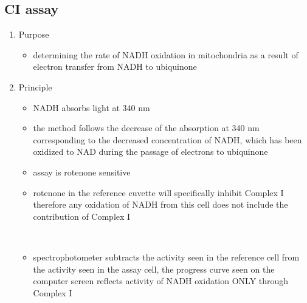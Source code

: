 \documentclass{scrartcl}
\begin{document}
\subsection{CI assay}
\label{sec:org10c68cd}
\begin{enumerate}
\item Purpose
\label{sec:org2d14a0b}
\begin{itemize}
\item determining the rate of NADH oxidation in mitochondria as a result
of electron transfer from NADH to ubiquinone
\end{itemize}
\item Principle
\label{sec:orgbd42876}
\begin{itemize}
\item NADH absorbs light at 340 nm
\item the method follows the decrease of the absorption at 340 nm
corresponding to the decreased concentration of NADH, which has been
oxidized to NAD during the passage of electrons to ubiquinone
\item assay is rotenone sensitive
\item rotenone in the reference cuvette will specifically inhibit Complex
I therefore any oxidation of NADH from this cell does not include
the contribution of Complex I
\end{itemize}

\\

\begin{itemize}
\item spectrophotometer subtracts the activity seen in the reference cell
from the activity seen in the assay cell, the progress curve seen on
the computer screen reflects activity of NADH oxidation ONLY through
Complex I
\end{itemize}
\end{enumerate}
\end{document}
